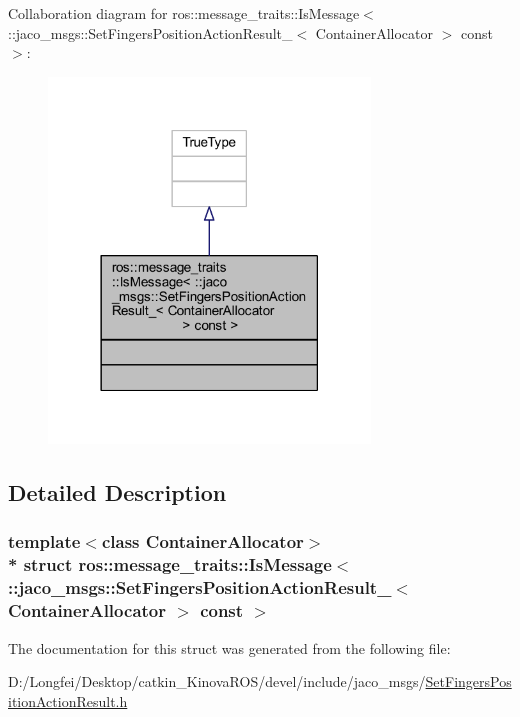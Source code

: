 Collaboration diagram for ros\+:\+:message\+\_\+traits\+:\+:Is\+Message$<$ \+:\+:jaco\+\_\+msgs\+:\+:Set\+Fingers\+Position\+Action\+Result\+\_\+$<$ Container\+Allocator $>$ const $>$\+:
\nopagebreak
\begin{figure}[H]
\begin{center}
\leavevmode
\includegraphics[width=242pt]{db/dc1/structros_1_1message__traits_1_1IsMessage_3_01_1_1jaco__msgs_1_1SetFingersPositionActionResult__29a821e8f55e7ccd54c25dcb0ef2a644}
\end{center}
\end{figure}


\subsection{Detailed Description}
\subsubsection*{template$<$class Container\+Allocator$>$\\*
struct ros\+::message\+\_\+traits\+::\+Is\+Message$<$ \+::jaco\+\_\+msgs\+::\+Set\+Fingers\+Position\+Action\+Result\+\_\+$<$ Container\+Allocator $>$ const  $>$}



The documentation for this struct was generated from the following file\+:\begin{DoxyCompactItemize}
\item 
D\+:/\+Longfei/\+Desktop/catkin\+\_\+\+Kinova\+R\+O\+S/devel/include/jaco\+\_\+msgs/\hyperlink{SetFingersPositionActionResult_8h}{Set\+Fingers\+Position\+Action\+Result.\+h}\end{DoxyCompactItemize}
